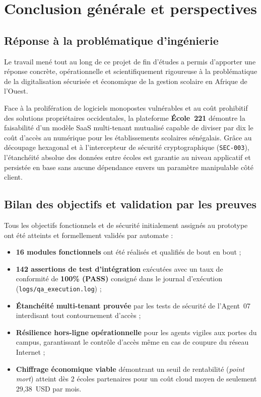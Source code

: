 \chapter*{Conclusion générale et perspectives}

\section*{Réponse à la problématique d'ingénierie}

Le travail mené tout au long de ce projet de fin d'études a permis d'apporter une réponse concrète, opérationnelle et scientifiquement rigoureuse à la problématique de la digitalisation sécurisée et économique de la gestion scolaire en Afrique de l'Ouest.

Face à la prolifération de logiciels monopostes vulnérables et au coût prohibitif des solutions propriétaires occidentales, la plateforme \textbf{École~221} démontre la faisabilité d'un modèle SaaS multi-tenant mutualisé capable de diviser par dix le coût d'accès au numérique pour les établissements scolaires sénégalais. Grâce au découpage hexagonal et à l'intercepteur de sécurité cryptographique (\texttt{SEC-003}), l'étanchéité absolue des données entre écoles est garantie au niveau applicatif et persistée en base sans aucune dépendance envers un paramètre manipulable côté client.

\section*{Bilan des objectifs et validation par les preuves}

Tous les objectifs fonctionnels et de sécurité initialement assignés au prototype ont été atteints et formellement validés par automate :

\begin{itemize}
  \item \textbf{16 modules fonctionnels} ont été réalisés et qualifiés de bout en bout ;
  \item \textbf{142 assertions de test d'intégration} exécutées avec un taux de conformité de \textbf{100\% (PASS)} consigné dans le journal d'exécution (\nolinkurl{logs/qa_execution.log}) ;
  \item \textbf{Étanchéité multi-tenant prouvée} par les tests de sécurité de l'Agent~07 interdisant tout contournement d'accès ;
  \item \textbf{Résilience hors-ligne opérationnelle} pour les agents vigiles aux portes du campus, garantissant le contrôle d'accès même en cas de coupure du réseau Internet ;
  \item \textbf{Chiffrage économique viable} démontrant un seuil de rentabilité (\emph{point mort}) atteint dès 2 écoles partenaires pour un coût cloud moyen de seulement 29,38~USD par mois.
\end{itemize}

